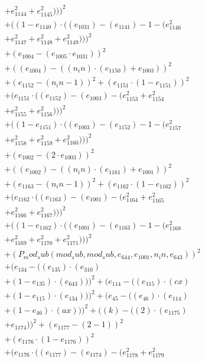 \documentclass[10pt, a4paper]{article}
\begin{document}
\begin{small}
\begin{align*}
& + e_{1144}^{2} + e_{1145}^{2})))^{2} \\
& + ((1 - e_{1140})  \cdot  ((e_{1031}) - (e_{1141}) - 1 - (e_{1146}^{2} \\
& + e_{1147}^{2} + e_{1148}^{2} + e_{1149}^{2})))^{2} \\
& + (e_{1004} - (e_{1005}  \cdot  e_{1031}))^{2} \\
& + ((e_{1004}) - ((n_in)  \cdot  (e_{1150}) + e_{1003}))^{2} \\
& + (e_{1152} - (n_in - 1))^{2} + (e_{1151}  \cdot  (1 - e_{1151}))^{2} \\
& + (e_{1151}  \cdot  ((e_{1152}) - (e_{1003}) - (e_{1153}^{2} + e_{1154}^{2} \\
& + e_{1155}^{2} + e_{1156}^{2})))^{2} \\
& + ((1 - e_{1151})  \cdot  ((e_{1003}) - (e_{1152}) - 1 - (e_{1157}^{2} \\
& + e_{1158}^{2} + e_{1159}^{2} + e_{1160}^{2})))^{2} \\
& + (e_{1002} - (2  \cdot  e_{1003}))^{2} \\
& + ((e_{1002}) - ((n_in)  \cdot  (e_{1161}) + e_{1001}))^{2} \\
& + (e_{1163} - (n_in - 1))^{2} + (e_{1162}  \cdot  (1 - e_{1162}))^{2} \\
& + (e_{1162}  \cdot  ((e_{1163}) - (e_{1001}) - (e_{1164}^{2} + e_{1165}^{2} \\
& + e_{1166}^{2} + e_{1167}^{2})))^{2} \\
& + ((1 - e_{1162})  \cdot  ((e_{1001}) - (e_{1163}) - 1 - (e_{1168}^{2} \\
& + e_{1169}^{2} + e_{1170}^{2} + e_{1171}^{2})))^{2} \\
& + (P_mod_sub(mod_sub, mod_sub, e_{644}, e_{1001}, n_in, e_{643}))^{2} \\
& + (e_{134} - ((e_{135})  \cdot  (e_{310}) \\
& + (1 - e_{135})  \cdot  (e_{643})))^{2} + (e_{114} - ((e_{115})  \cdot  (cx) \\
& + (1 - e_{115})  \cdot  (e_{134})))^{2} + (e_{45} - ((e_{46})  \cdot  (e_{114}) \\
& + (1 - e_{46})  \cdot  (ax)))^{2} + ((k) - ((2)  \cdot  (e_{1175}) \\
& + e_{1174}))^{2} + (e_{1177} - (2 - 1))^{2} \\
& + (e_{1176}  \cdot  (1 - e_{1176}))^{2} \\
& + (e_{1176}  \cdot  ((e_{1177}) - (e_{1174}) - (e_{1178}^{2} + e_{1179}^{2} \\

\end{align*}
\end{small}
\end{document}
